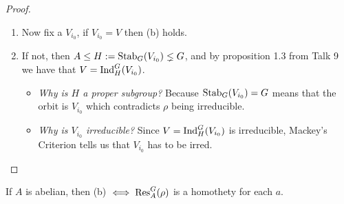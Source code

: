 \documentclass[a4paper]{article}
\begin{document}
\begin{prop}[Prop 24]
\begin{proof}
\begin{enumerate}[(1)]
\begin{itemize}
            \end{itemize}
      \item Now fix a $V_{i_{0}}$, if $V_{i_{0}}= V$ then (b) holds.
      \item If not, then $A \le H:= \operatorname{Stab}_{G}(V_{i_{0}}) \lneq G$, and by proposition 1.3 from Talk 9 we have that $V = \operatorname{Ind}_{H}^{G}(V_{i_{0}})$.
            \begin{itemize}
\item \emph{Why is $H$ a proper subgroup?} Because $\operatorname{Stab}_{G}(V_{i_{0}}) = G$ means that the orbit is $V_{i_{0}}$ which contradicts $\rho$ being irreducible.
\item \emph{Why is $V_{i_{0}}$ irreducible?} Since $V = \operatorname{Ind}_{H}^{G}(V_{i_{0}})$ is irreducible, Mackey's Criterion tells us that $V_{i_{0}}$ has to be irred.
            \end{itemize}

\end{enumerate}  \end{proof}
\end{prop}
\begin{rem*}
If $A$ is abelian, then (b) $\iff \operatorname{Res}_{A}^{G}(\rho)$ is a homothety for each $a$.
\end{rem*}
\end{document}
